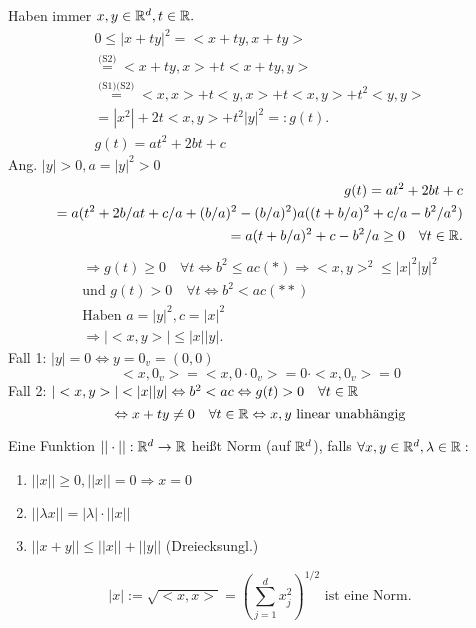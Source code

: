 \begin{bew}
	Haben immer \( x,y\in\mathbb{R}^d, t\in\mathbb{R}. \)
	\begin{align*}
		0\leq |x+ty|^2 = <x+ty, x+ty>\\
		\overset{\text{(S2)}}{=} <x+ty,x> + t<x+ty,y>\\
		\overset{\text{(S1)(S2)}}{=} <x,x> + t<y,x> + t<x,y> + t^2<y,y>\\
		= |x^2| + 2t<x,y> + t^2|y|^2 =: g(t).\\
		g(t) = at^2 + 2bt + c
	\end{align*}
	Ang. \(|y| > 0, a = |y|^2 > 0 \)
	\begin{align*}
		g(t) = at^2 + 2bt + c\\
		= a(t^2 + 2b/a t + c/a + (b/a)^2 - (b/a)^2) a((t+b/a)^2 + c/a - b^2/a^2)\\
		= a(t+b/a)^2 + c - b^2/a \geq 0 \quad\forall t\in\mathbb{R}.
	\end{align*}
	\begin{align*}
		\Rightarrow g(t) \geq 0 \quad\forall t \Leftrightarrow b^2 \leq ac (*) \Rightarrow <x,y>^2 \leq |x|^2|y|^2\\
		\text{und }g(t) > 0 \quad\forall t \Leftrightarrow b^2 < ac (**)\\
		\text{Haben }  a=|y|^2, c=|x|^2\\
		\Rightarrow |<x,y>|\leq |x||y|.
	\end{align*}
	Fall 1: \(|y| = 0 \Leftrightarrow y = 0_v = (0, 0)\)
	\[<x, 0_v> = <x, 0 \cdot 0_v> = 0 \cdot <x, 0_v> = 0\]
	Fall 2: \(|<x, y>| < |x||y| \Leftrightarrow b^2 < ac \Leftrightarrow g(t) > 0 \quad \forall t \in \mathbb{R}\)\\
	\[\Leftrightarrow x + ty \neq 0 \quad \forall t \in \mathbb{R} \Leftrightarrow x, y \text{ linear unabhängig} \]
\end{bew}
\begin{defi}
	Eine Funktion \( ||\cdot || : \mathbb{R}^d \rightarrow \mathbb{R} \) heißt Norm (auf \( \mathbb{R}^d \)), falls \( \forall x,y\in\mathbb{R}^d, \lambda\in\mathbb{R}: \)
	\begin{enumerate}
		\item \( ||x||\geq 0, ||x|| = 0 \Rightarrow x = 0 \)
		\item \( ||\lambda x|| = |\lambda|\cdot||x|| \)
		\item \( ||x+y|| \leq ||x|| + ||y|| \) (Dreiecksungl.)
	\end{enumerate}
\end{defi}
\begin{satz}
	\[ |x| := \sqrt{<x,x>} = \left(\sum_{j=1}^{d} x_j^2\right)^{1/2} \text{ ist eine Norm}. \]
\end{satz}
